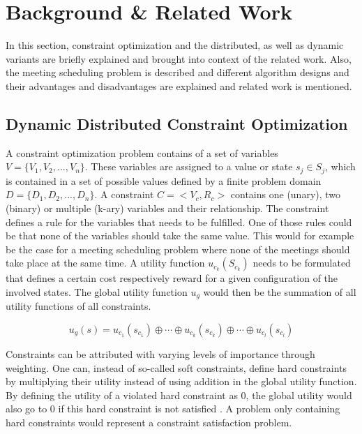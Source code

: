\chapter{Background \& Related Work}

In this section, constraint optimization and the distributed, as well as dynamic variants are briefly explained and brought into context of the related work. Also, the meeting scheduling problem is described and different algorithm designs and their advantages and disadvantages are explained and related work is mentioned.
    
\section{Dynamic Distributed Constraint Optimization}

    
A constraint optimization problem contains of a set of variables \(V=\{V_{1},V_{2}, ...,  V_{n}\}\). These variables are assigned to a value or state \(s_{j} \in S_{j}\), which is contained in a set of possible values defined by a finite problem domain \(D=\{D_{1},D_{2}, ...,  D_{n}\}\). A constraint \(C = <V_{c}, R_{c}>\) contains one (unary), two (binary) or multiple (k-ary) variables and their relationship. The constraint defines a rule for the variables that needs to be fulfilled. One of those rules could be that none of the variables should take the same value. This would for example be the case for a meeting scheduling problem where none of the meetings should take place at the same time. \newline
A utility function \(u_{{c}_{k}}(S_{{c}_{k}})\) needs to be formulated that defines a certain cost respectively reward for a given configuration of the involved states. The global utility function \(u_{g}\) would then be the summation of all utility functions of all constraints. 

\[u_{g}(s) = u_{c_{1}}(s_{c_{1}}) \oplus \cdots \oplus u_{c_{k}}(s_{c_{k}}) \oplus \cdots \oplus u_{c_{l}}(s_{c_{l}}) \] 

Constraints can be attributed with varying levels of importance through weighting. One can, instead of so-called soft constraints, define hard constraints by multiplying their utility instead of using addition in the global utility function. By defining the utility of a violated hard constraint as 0, the global utility would also go to 0 if this hard constraint is not satisfied \cite{Chapman2011, Petcu2003}. A problem only containing hard constraints would represent a constraint satisfaction problem.

